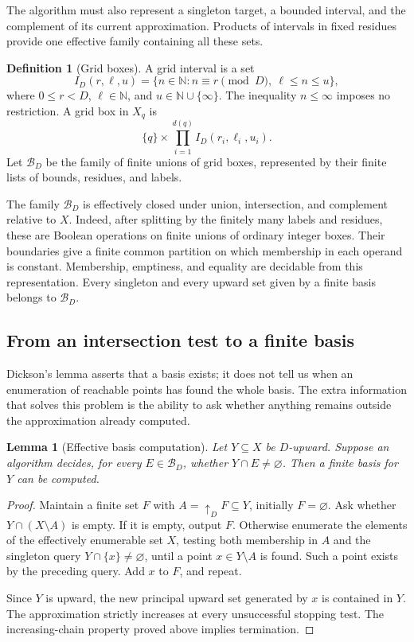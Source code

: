 \documentclass[11pt,a4paper]{article}
\newtheorem{lemma}[theorem]{Lemma}
\theoremstyle{definition}
\newtheorem{definition}[theorem]{Definition}
\theoremstyle{remark}
\newcommand{\N}{\mathbb N}
\begin{document}
The algorithm must also represent a singleton target, a bounded
interval, and the complement of its current approximation.
Products of intervals in fixed residues provide one effective family
containing all these sets.

\begin{definition}[Grid boxes]
\label{def:grid-boxes}
A grid interval is a set
\[
 I_D(r,\ell,u)
   =\{n\in\N:n\equiv r\pmod D,\ \ell\leq n\leq u\},
\]
where \(0\leq r<D\), \(\ell\in\N\), and
\(u\in\N\cup\{\infty\}\). The inequality \(n\leq\infty\) imposes no
restriction. A grid box in \(X_q\) is
\[
 \{q\}\times\prod_{i=1}^{d(q)} I_D(r_i,\ell_i,u_i).
\]
Let \(\mathcal B_D\) be the family of finite unions of grid boxes,
represented by their finite lists of bounds, residues, and labels.
\end{definition}

The family \(\mathcal B_D\) is effectively closed under union,
intersection, and complement relative to \(X\). Indeed, after splitting
by the finitely many labels and residues, these are Boolean operations
on finite unions of ordinary integer boxes. Their boundaries give a
finite common partition on which membership in each operand is constant.
Membership, emptiness, and equality are decidable from this
representation. Every singleton and every upward set given by a finite
basis belongs to \(\mathcal B_D\).

\subsection{From an intersection test to a finite basis}

Dickson's lemma asserts that a basis exists; it does not tell us when
an enumeration of reachable points has found the whole basis. The
extra information that solves this problem is the ability to ask
whether anything remains outside the approximation already computed.

\begin{lemma}[Effective basis computation]
\label{lem:effective-basis}
Let \(Y\subseteq X\) be \(D\)-upward. Suppose an algorithm decides,
for every \(E\in\mathcal B_D\), whether \(Y\cap E\neq\varnothing\).
Then a finite basis for \(Y\) can be computed.
\end{lemma}
\begin{proof}
Maintain a finite set \(F\) with
\(A=\mathord{\uparrow_D}F\subseteq Y\), initially \(F=\varnothing\).
Ask whether \(Y\cap(X\setminus A)\) is empty. If it is empty, output
\(F\). Otherwise enumerate the elements of the effectively enumerable
set \(X\), testing both membership in \(A\) and the singleton query
\(Y\cap\{x\}\neq\varnothing\), until a point \(x\in Y\setminus A\)
is found. Such a point exists by the preceding query. Add \(x\) to
\(F\), and repeat.

Since \(Y\) is upward, the new principal upward set generated by \(x\)
is contained in \(Y\). The approximation strictly increases at every
unsuccessful stopping test. The increasing-chain property proved
above implies termination.
\end{proof}
\end{document}
